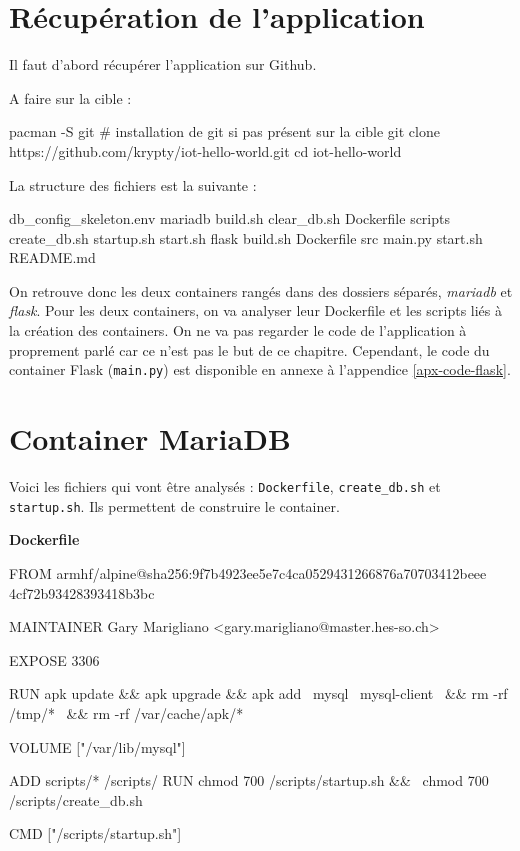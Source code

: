 \documentclass[11pt,a4paper,oneside]{report}
\newcommand{\code}[1]{\texttt{#1}}
\begin{document}
\section{Récupération de l'application}
Il faut d'abord récupérer l'application sur Github.

A faire sur la cible :
\begin{bashcode}
pacman -S git # installation de git si pas présent sur la cible
git clone https://github.com/krypty/iot-hello-world.git
cd iot-hello-world
\end{bashcode}

La structure des fichiers est la suivante :
\begin{textcode}
db_config_skeleton.env
mariadb
    build.sh
    clear_db.sh
    Dockerfile
    scripts
        create_db.sh
        startup.sh
    start.sh
flask
    build.sh
    Dockerfile
    src
        main.py
    start.sh
README.md
\end{textcode}

On retrouve donc les deux containers rangés dans des dossiers séparés, \textit{mariadb} et \textit{flask}. Pour les deux containers, on va analyser leur Dockerfile et les scripts liés à la création des containers. On ne va pas regarder le code de l'application à proprement parlé car ce n'est pas le but de ce chapitre. Cependant, le code du container Flask (\code{main.py}) est disponible en annexe à l'appendice \ref{apx-code-flask}.


\section{Container MariaDB}
Voici les fichiers qui vont être analysés : \code{Dockerfile}, \code{create\_db.sh} et \code{startup.sh}. Ils permettent de construire le container.

\textbf{Dockerfile}
\begin{bashcode}
FROM armhf/alpine@sha256:9f7b4923ee5e7c4ca0529431266876a70703412beee
4cf72b93428393418b3bc

MAINTAINER Gary Marigliano <gary.marigliano@master.hes-so.ch>

EXPOSE 3306

RUN apk update && apk upgrade && apk add \
  mysql \
  mysql-client \
  && rm -rf /tmp/* \
  && rm -rf /var/cache/apk/*

VOLUME ["/var/lib/mysql"]

ADD scripts/* /scripts/
RUN chmod 700 /scripts/startup.sh && \
    chmod 700 /scripts/create_db.sh

CMD ["/scripts/startup.sh"]
\end{bashcode}
\end{document}
